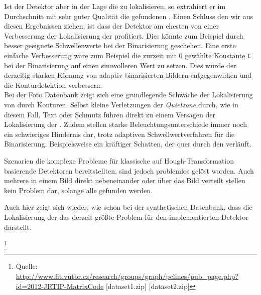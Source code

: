 Ist der Detektor aber in der Lage die \fps zu lokalisieren, so extrahiert er im Durchschnitt mit sehr guter Qualität die gefundenen \QRCodes.
Einen Schluss den wir aus diesen Ergebnissen ziehen, ist dass der Detektor am ehesten von einer Verbesserung der Lokalisierung der \fps profitiert. Dies könnte zum Beispiel durch besser geeignete Schwellenwerte bei der Binarisierung geschehen. Eine erste einfache Verbesserung wäre zum Beispiel die zurzeit mit $0$ gewählte Konstante \texttt{C} bei der Binarisierung auf einen sinnvolleren Wert zu setzen. Dies würde der derzeitig starken Körnung von adaptiv binarisierten Bildern entgegenwirken und die Konturdetektion verbessern.
\\
Bei der Foto Datenbank zeigt sich eine grundlegende Schwäche der Lokalisierung von \fps durch Konturen. Selbst kleine Verletzungen der \emph{Quietzone} durch, wie in diesem Fall, Text oder Schmutz führen direkt zu einem Versagen der Lokalisierung der \fps. Zudem stellen starke Beleuchtungsunterschiede immer noch ein schwieriges Hindernis dar, trotz adaptiven Schwellwertverfahren für die Binarisierung. Beispielsweise ein kräftiger Schatten, der quer durch den \QRCode verläuft.

Szenarien die komplexe Probleme für klassische auf Hough-Transformation basierende Detektoren bereitstellten, sind jedoch problemlos gelöst worden. Auch mehrere \QRCodes in einem Bild direkt nebeneinander oder über das Bild verteilt stellen kein Problem dar, solange alle \fps gefunden werden.

Auch hier zeigt sich wieder, wie schon bei der synthetischen Datenbank, dass die Lokalisierung der \fps das derzeit größte Problem für den implementierten Detektor darstellt.

\footnote{Quelle: \url{http://www.fit.vutbr.cz/research/groups/graph/pclines/pub_page.php?id=2012-JRTIP-MatrixCode} [dataset1.zip] [dataset2.zip]}